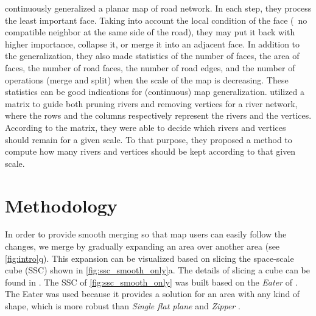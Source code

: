 \documentclass[ijgi,article,submit,moreauthors,pdftex]{Definitions/mdpi}
\begin{document}
\citet{Suba2016Road} continuously generalized a planar map of road network.
In each step, they process the least important face.
Taking into account the local condition of the face
(\eg~no compatible neighbor at the same side of the road),
they may put it back with higher importance, collapse it, 
or merge it into an adjacent face.
In addition to the generalization, 
they also made statistics of the number of faces,
the area of faces, the number of road faces, the number of road edges,
and the number of operations (merge and split) 
when the scale of the map is decreasing.
These statistics can be good indications 
for (continuous) map generalization.
\citet{Huang2017Matrix} utilized a matrix to guide 
both pruning rivers and removing vertices for a river network, 
where the rows and the columns respectively represent
the rivers and the vertices.
According to the matrix, 
they were able to decide which rivers and vertices 
should remain for a given scale.
To that purpose, they proposed a method 
to compute how many rivers and vertices 
should be kept according to that given scale.






%

\section{Methodology}
\label{sec:methodology}



In order to provide smooth merging
so that map users can easily follow the changes,
we merge by gradually expanding an area over another area
(see \fig\ref{fig:intro}q).
This expansion can be visualized based on slicing the space-scale cube (SSC) shown in
\fig\ref{fig:ssc_smooth_only}a.
The details of slicing a cube can be found in \citet{Meijers2020Web}.
The SSC of \fig\ref{fig:ssc_smooth_only} was built 
based on the \emph{Eater} of \citet{Suba2014Merge}.
The Eater was used because it provides a solution 
for an area with any kind of shape, which is more robust than
\emph{Single flat plane} and \emph{Zipper} \citep{Suba2014Merge}.
\end{document}
